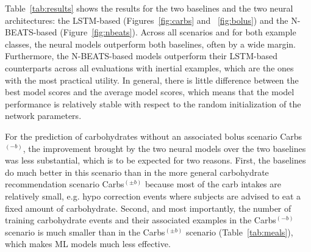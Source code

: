 \documentclass[journal,article,submit,moreauthors,pdftex]{Definitions/mdpi}
\begin{document}
Table~\ref{tab:results} shows the results for the two baselines and the two neural architectures: the LSTM-based (Figures~\ref{fig:carbs} and ~\ref{fig:bolus}) and the N-BEATS-based (Figure~\ref{fig:nbeats}). Across all scenarios and for both example classes, the neural models outperform both baselines, often by a wide margin. Furthermore, the N-BEATS-based models outperform their LSTM-based counterparts across all evaluations with inertial examples, which are the ones with the most practical utility. In general, there is little difference between the best model scores and the average model scores, which means that the model performance is relatively stable with respect to the random initialization of the network parameters.

For the prediction of carbohydrates without an associated bolus scenario Carbs$^{(-b)}$, the improvement brought by the two neural models over the two baselines was less substantial, which is to be expected for two reasons. First, the baselines do much better in this scenario than in the more general carbohydrate recommendation scenario Carbs$^{(\pm b)}$ because most of the carb intakes are relatively small, e.g. hypo correction events where subjects are advised to eat a fixed amount of carbohydrate. Second, and most importantly, the number of training carbohydrate events and their associated examples in the Carbs$^{(-b)}$ scenario is much smaller than in the Carbs$^{(\pm b)}$ scenario (Table~\ref{tab:meals}), which makes ML models much less effective.
\end{document}
